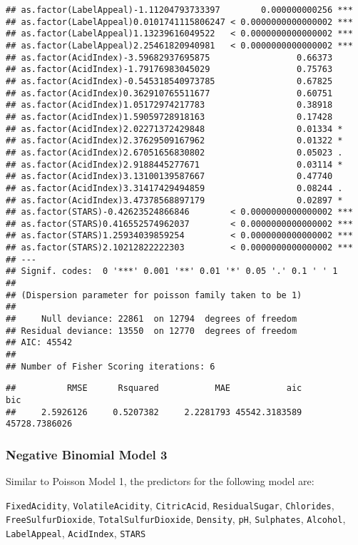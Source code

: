 \documentclass[
]{article}
\begin{document}
\begin{verbatim}
## as.factor(LabelAppeal)-1.11204793733397        0.000000000256 ***
## as.factor(LabelAppeal)0.0101741115806247 < 0.0000000000000002 ***
## as.factor(LabelAppeal)1.13239616049522   < 0.0000000000000002 ***
## as.factor(LabelAppeal)2.25461820940981   < 0.0000000000000002 ***
## as.factor(AcidIndex)-3.59682937695875                 0.66373    
## as.factor(AcidIndex)-1.79176983045029                 0.75763    
## as.factor(AcidIndex)-0.545318540973785                0.67825    
## as.factor(AcidIndex)0.362910765511677                 0.60751    
## as.factor(AcidIndex)1.05172974217783                  0.38918    
## as.factor(AcidIndex)1.59059728918163                  0.17428    
## as.factor(AcidIndex)2.02271372429848                  0.01334 *  
## as.factor(AcidIndex)2.37629509167962                  0.01322 *  
## as.factor(AcidIndex)2.67051656830802                  0.05023 .  
## as.factor(AcidIndex)2.9188445277671                   0.03114 *  
## as.factor(AcidIndex)3.13100139587667                  0.47740    
## as.factor(AcidIndex)3.31417429494859                  0.08244 .  
## as.factor(AcidIndex)3.47378568897179                  0.02897 *  
## as.factor(STARS)-0.42623524866846        < 0.0000000000000002 ***
## as.factor(STARS)0.416552574962037        < 0.0000000000000002 ***
## as.factor(STARS)1.25934039859254         < 0.0000000000000002 ***
## as.factor(STARS)2.10212822222303         < 0.0000000000000002 ***
## ---
## Signif. codes:  0 '***' 0.001 '**' 0.01 '*' 0.05 '.' 0.1 ' ' 1
## 
## (Dispersion parameter for poisson family taken to be 1)
## 
##     Null deviance: 22861  on 12794  degrees of freedom
## Residual deviance: 13550  on 12770  degrees of freedom
## AIC: 45542
## 
## Number of Fisher Scoring iterations: 6
\end{verbatim}

\begin{verbatim}
##          RMSE      Rsquared           MAE           aic           bic 
##     2.5926126     0.5207382     2.2281793 45542.3183589 45728.7386026
\end{verbatim}

\hypertarget{negative-binomial-model-3}{%
\subsubsection{Negative Binomial Model
3}\label{negative-binomial-model-3}}

Similar to Poisson Model 1, the predictors for the following model are:

\texttt{FixedAcidity}, \texttt{VolatileAcidity}, \texttt{CitricAcid},
\texttt{ResidualSugar}, \texttt{Chlorides}, \texttt{FreeSulfurDioxide},
\texttt{TotalSulfurDioxide}, \texttt{Density}, \texttt{pH},
\texttt{Sulphates}, \texttt{Alcohol}, \texttt{LabelAppeal},
\texttt{AcidIndex}, \texttt{STARS}
\end{document}

